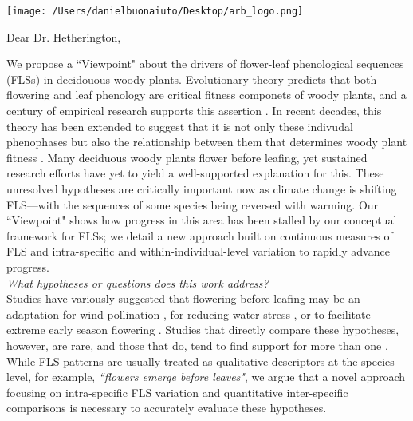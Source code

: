 \documentclass[10.5pt,a4paper]{article}
\begin{document}

\def\labelitemi{--}
\parindent=24pt
\texttt{[image: /Users/danielbuonaiuto/Desktop/arb\_logo.png]}
\opening{Dear Dr. Hetherington,}
\par We propose a ``Viewpoint" about the drivers of flower-leaf phenological sequences (FLSs) in decidouous woody plants. Evolutionary theory predicts that both flowering and leaf phenology are critical fitness componets of woody plants, and a century of empirical research supports this assertion \citep{}. In recent decades, this theory has been extended to suggest that it is not only these indivudal phenophases but also the relationship between them that determines woody plant fitness \citep{}. Many deciduous woody plants flower before leafing, yet sustained research efforts have yet to yield a well-supported explanation for this. These unresolved hypotheses are critically important now as climate change is shifting FLS---with the sequences of some species being reversed with warming. Our ``Viewpoint" shows how progress in this area has been stalled by our conceptual framework for FLSs; we detail a new approach built on continuous measures of FLS and intra-specific and within-individual-level variation to rapidly advance progress.\\

\noindent \emph{What hypotheses or questions does this work address?}\\
Studies have variously suggested that flowering before leafing may be an adaptation for wind-pollination \citep{}, for reducing water stress \citep{}, or to facilitate extreme early season flowering \citep{}. Studies that directly compare these hypotheses, however, are rare, and those that do, tend to find support for more than one \citep{}. While FLS patterns are usually treated as qualitative descriptors at the species level, for example, \textit{``flowers emerge before leaves"}, we argue that a novel approach focusing on intra-specific FLS variation and quantitative inter-specific comparisons is necessary to accurately evaluate these hypotheses. \\
\end{document}
